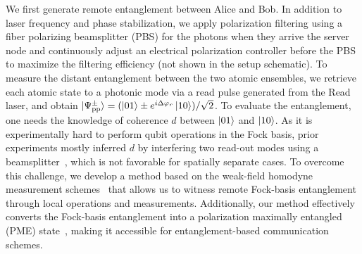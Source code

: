 \documentclass[aps,reprint,showpacs,superscriptaddress]{revtex4-2}
\begin{document}
We first generate remote entanglement between Alice and Bob. In addition to laser frequency and phase stabilization, we apply polarization filtering using a fiber polarizing beamsplitter (PBS) for the photons when they arrive the server node and continuously adjust an electrical polarization controller before the PBS to maximize the filtering efficiency (not shown in the setup schematic). To measure the distant entanglement between the two atomic ensembles, we retrieve each atomic state to a photonic mode via a read pulse generated from the Read laser, and obtain $\ket{\Psi_{\text{pp}}^{\pm}}=(\ket{01}\pm e^{i\Delta\varphi_r}\ket{10})/\sqrt{2}$. To evaluate the entanglement, one needs the knowledge of coherence $d$ between $\ket{01}$ and $\ket{10}$. As it is experimentally hard to perform qubit operations in the Fock basis, prior experiments mostly inferred $d$ by interfering two read-out modes using a beamsplitter~\cite{chou2005,yu2020,lago-rivera2021}, which is not favorable for spatially separate cases. To overcome this challenge, we develop a method based on the weak-field homodyne measurement schemes~\cite{tan1991,li2013} that allows us to witness remote Fock-basis entanglement through local operations and measurements. Additionally, our method effectively converts the Fock-basis entanglement into a polarization maximally entangled (PME) state~\cite{duan2001}, making it accessible for entanglement-based communication schemes.
\end{document}
